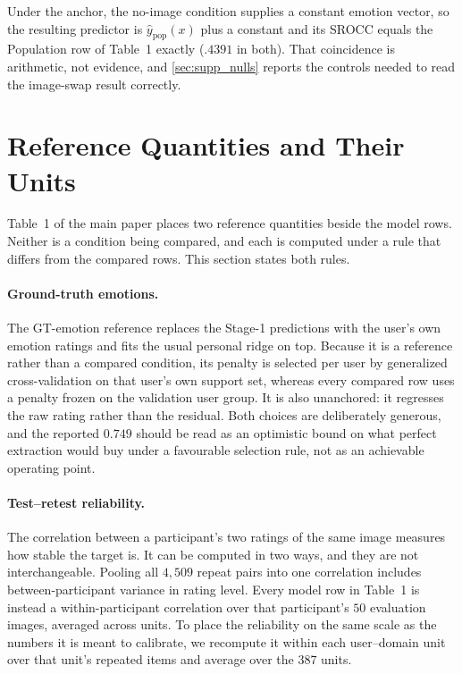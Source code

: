 Under the anchor, the no-image condition supplies a constant emotion vector, so
the resulting predictor is $\hat y_{\mathrm{pop}}(x)$ plus a constant and its
SROCC equals the Population row of Table~1 exactly ($.4391$ in both). That
coincidence is arithmetic, not evidence, and \cref{sec:supp_nulls} reports the
controls needed to read the image-swap result correctly.


\section{Reference Quantities and Their Units}
\label{sec:supp_reference}

Table~1 of the main paper places two reference quantities beside the model
rows. Neither is a condition being compared, and each is computed under a rule
that differs from the compared rows. This section states both rules.

\paragraph{Ground-truth emotions.}
The GT-emotion reference replaces the Stage-1 predictions with the user's own
emotion ratings and fits the usual personal ridge on top. Because it is a
reference rather than a compared condition, its penalty is selected per user by
generalized cross-validation on that user's own support set, whereas every
compared row uses a penalty frozen on the validation user group. It is also
unanchored: it regresses the raw rating rather than the residual. Both choices
are deliberately generous, and the reported $0.749$ should be read as an
optimistic bound on what perfect extraction would buy under a favourable
selection rule, not as an achievable operating point.

\paragraph{Test--retest reliability.}
The correlation between a participant's two ratings of the same image measures
how stable the target is. It can be computed in two ways, and they are not
interchangeable. Pooling all $4{,}509$ repeat pairs into one correlation
includes between-participant variance in rating level. Every model row in
Table~1 is instead a within-participant correlation over that participant's
$50$ evaluation images, averaged across units. To place the reliability on the
same scale as the numbers it is meant to calibrate, we recompute it within each
user--domain unit over that unit's repeated items and average over the $387$
units.

